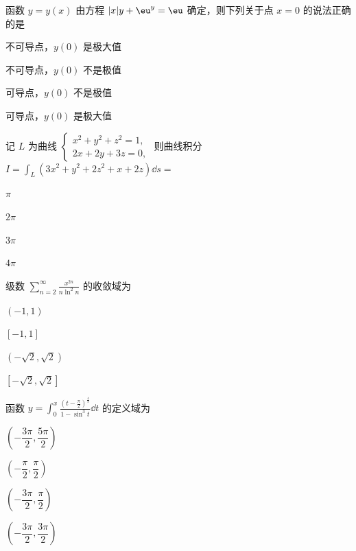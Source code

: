 
\begin{question}[index=1]
函数 $y=y(x)$ 由方程 $|x|y+\eu^y=\eu$ 确定，则下列关于点 $x=0$ 的说法正确的是
\begin{choices}[columns=2]
\item 不可导点，$y(0)$ 是极大值
\item 不可导点，$y(0)$ 不是极值
\item 可导点，$y(0)$ 不是极值
\item 可导点，$y(0)$ 是极大值
\end{choices}
\end{question}
\QuestionBreak

\begin{question}[index=2]
记 $L$ 为曲线 $\begin{cases}x^2+y^2+z^2=1,\\2x+2y+3z=0,\end{cases}$ 则曲线积分
$\displaystyle I=\int_L(3x^2+y^2+2z^2+x+2z)\dd s=$
\begin{choices}[columns=4]
\item $\pi$
\item $2\pi$
\item $3\pi$
\item $4\pi$
\end{choices}
\end{question}
\QuestionBreak

\begin{question}[index=3]
级数 $\displaystyle\sum_{n=2}^{\infty}\frac{x^{2n}}{n\ln^2 n}$ 的收敛域为
\begin{choices}[columns=4]
\item $(-1,1)$
\item $[-1,1]$
\item $(-\sqrt{2},\sqrt{2})$
\item $[-\sqrt{2},\sqrt{2}]$
\end{choices}
\end{question}
\QuestionBreak

\begin{question}[index=4]
函数 $\displaystyle y=\int_0^x\frac{\left(t-\frac{\pi}{2}\right)^{\frac43}}{1-\sin^3t}\dd t$ 的定义域为
\begin{choices}[columns=4]
\item $\left(-\dfrac{3\pi}{2},\dfrac{5\pi}{2}\right)$
\item $\left(-\dfrac{\pi}{2},\dfrac{\pi}{2}\right)$
\item $\left(-\dfrac{3\pi}{2},\dfrac{\pi}{2}\right)$
\item $\left(-\dfrac{3\pi}{2},\dfrac{3\pi}{2}\right)$
\end{choices}
\end{question}
\QuestionBreak

